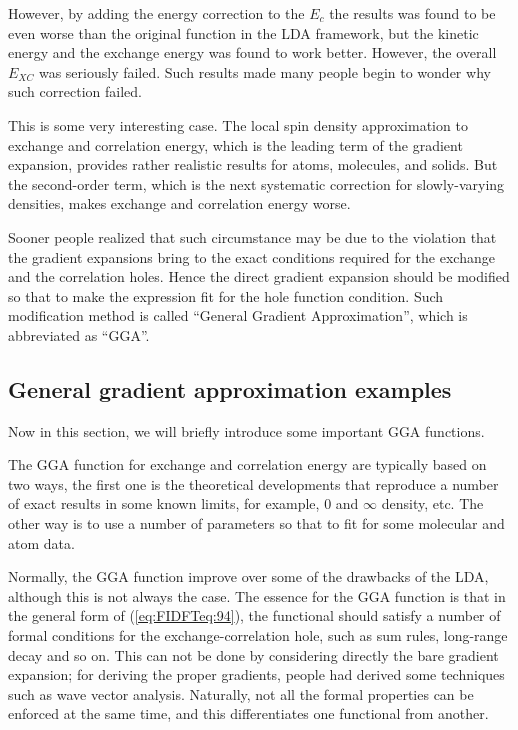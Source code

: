 However, by adding the energy correction to the $E_{c}$ the results
was found to be even worse than the original function in the LDA
framework, but the kinetic energy and the exchange energy was found to
work better. However, the overall $E_{XC}$ was seriously failed. Such
results made many people begin to wonder why such correction failed.

This is some very interesting case. The local spin density
approximation to exchange and correlation energy, which is the leading
term of the gradient expansion, provides rather realistic results for
atoms, molecules, and solids. But the second-order term, which is the
next systematic correction for slowly-varying densities, makes
exchange and correlation energy worse.

Sooner people realized that such circumstance may be due to the
violation that the gradient expansions bring to the exact conditions
required for the exchange and the correlation holes. Hence the direct
gradient expansion should be modified so that to make the expression
fit for the hole function condition. Such modification method is
called ``General Gradient Approximation'', which is abbreviated as
``GGA''. 


\subsection{General gradient approximation examples}
\label{sec:gener-grad-appr_examples}
%
%
%
%
Now in this section, we will briefly introduce some important GGA
functions. 

The GGA function for exchange and correlation energy are typically
based on two ways, the first one is the theoretical developments that
reproduce a number of exact results in some known limits, for example,
$0$ and $\infty$ density, etc. The other way is to use a number of
parameters so that to fit for some molecular and atom data.

Normally, the GGA function improve over some of the drawbacks of the
LDA, although this is not always the case. The essence for the GGA
function is that in the general form of (\ref{eq:FIDFTeq:94}), the
functional should satisfy a number of formal conditions for the
exchange-correlation hole, such as sum rules, long-range decay and so
on. This can not be done by considering directly the bare gradient
expansion; for deriving the proper gradients, people had derived some
techniques such as wave vector
analysis\cite{PhysRevB.15.2884}. Naturally, not all the formal
properties can be enforced at the same time, and this differentiates
one functional from another.

